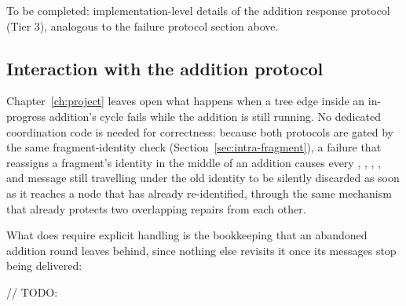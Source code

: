 To be completed: implementation-level details of the addition response protocol
(Tier 3), analogous to the failure protocol section above.

\subsection{Interaction with the addition protocol}\label{sec:failure-addition}

Chapter~\ref{ch:project} leaves open what happens when a tree edge inside an in-progress
addition's cycle fails while the addition is still running. No dedicated coordination code
is needed for correctness: because both protocols are gated by the same fragment-identity
check (Section~\ref{sec:intra-fragment}), a failure that reassigns a fragment's identity
in the middle of an addition causes every , ,
, , and  message still travelling under the old
identity to be silently discarded as soon as it reaches a node that has already
re-identified, through the same mechanism that already protects two overlapping repairs
from each other.

What does require explicit handling is the bookkeeping that an abandoned addition round
leaves behind, since nothing else revisits it once its messages stop being delivered:

// TODO:
